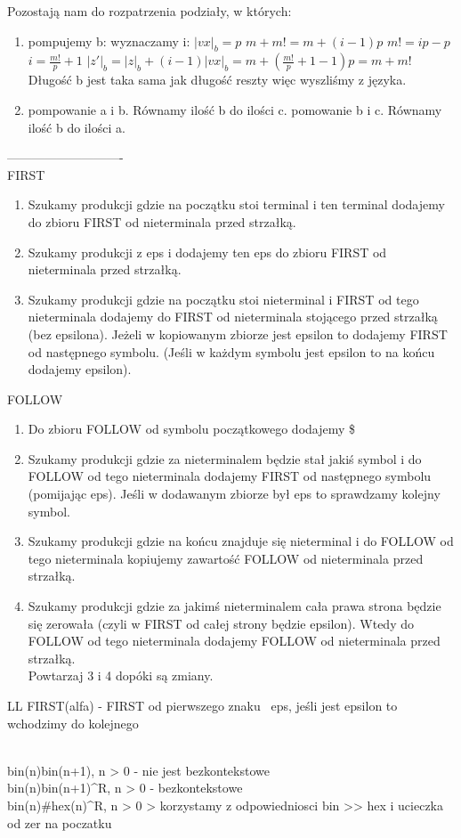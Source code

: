  
 Pozostają nam do rozpatrzenia podziały, w których:
 \begin{enumerate}
 	\item pompujemy b:\newline
 	wyznaczamy i: 
 	$|vx|_{b} = p$
 	\newline
 	$m+m! = m + (i-1)p$
 	\newline
 	$m! = ip - p$
 	\newline
 	$i = \frac{m!}{p} + 1$
 	\newline
 	\newline
 	$|z'|_{b}=|z|_{b} + (i-1)|vx|_{b} = m + (\frac{m!}{p} + 1 - 1)p = m + m!$
 	\newline
 	Długość b jest taka sama jak długość reszty więc wyszliśmy z języka. 
 	\item pompowanie a i b. Równamy ilość b do ilości c.
 	\newline
 	pomowanie b i c. Równamy ilość b do ilości a.
 \end{enumerate}
----------------------------\\
FIRST
\begin{enumerate}
  \item Szukamy produkcji gdzie na początku stoi terminal i ten terminal dodajemy do zbioru FIRST od nieterminala przed strzałką.
  \item Szukamy produkcji z eps i dodajemy ten eps do zbioru FIRST od nieterminala przed strzałką.
  \item Szukamy produkcji gdzie na początku stoi nieterminal i FIRST od tego nieterminala dodajemy do FIRST od nieterminala stojącego przed strzałką (bez epsilona). Jeżeli w kopiowanym zbiorze jest epsilon to dodajemy FIRST od następnego symbolu. (Jeśli w każdym symbolu jest epsilon to na końcu dodajemy epsilon).
\end{enumerate}

FOLLOW
\begin{enumerate}
  \item Do zbioru FOLLOW od symbolu początkowego dodajemy \$
  \item  Szukamy produkcji gdzie za nieterminalem będzie stał jakiś symbol i do FOLLOW od tego nieterminala dodajemy FIRST od następnego symbolu (pomijając eps). Jeśli w dodawanym zbiorze był eps to sprawdzamy kolejny symbol.
  \item Szukamy produkcji gdzie na końcu znajduje się nieterminal i do FOLLOW od tego nieterminala kopiujemy zawartość FOLLOW od nieterminala przed strzałką. 
  \item Szukamy produkcji gdzie za jakimś nieterminalem cała prawa strona będzie się zerowała (czyli w FIRST od całej strony będzie epsilon). Wtedy do FOLLOW od tego nieterminala dodajemy FOLLOW od nieterminala przed strzałką. \\
  Powtarzaj 3 i 4 dopóki są zmiany.
\end{enumerate}

LL
FIRST(alfa) - FIRST od pierwszego znaku \ {eps}, jeśli jest epsilon to wchodzimy do kolejnego

\\
bin(n)bin(n+1), n > 0 - nie jest bezkontekstowe \\
bin(n)bin(n+1)^R, n > 0 - bezkontekstowe \\
bin(n)#hex(n)^R, n > 0 > korzystamy z odpowiedniosci bin >> hex i ucieczka od zer na poczatku \\
